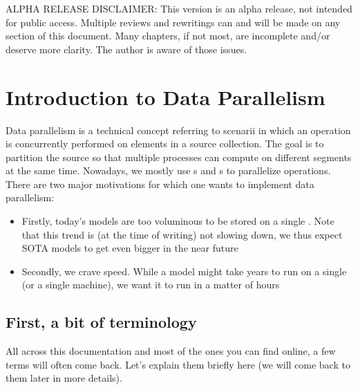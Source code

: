 \documentclass{article}
\begin{document}
ALPHA RELEASE DISCLAIMER: This version is an alpha release, not intended for public access. Multiple reviews and rewritings can and will be made on any section of this document. Many chapters, if not most, are incomplete and/or deserve more clarity. The author is aware of those issues.

\clearpage

\section{Introduction to Data Parallelism}
Data parallelism is a technical concept referring to scenarii in which an operation is concurrently performed on elements in a source collection. The goal is to partition the source so that multiple processes can compute on different segments at the same time. Nowadays, we mostly use s and s to parallelize operations. There are two major motivations for which one wants to implement data parallelism:
\begin{itemize}
  \item Firstly, today's models are too voluminous to be stored on a single . Note that this trend is (at the time of writing) not slowing down, we thus expect \Gls{SOTA} models to get even bigger in the near future
  \item Secondly, we crave speed. While a model might take years to run on a single  (or a single machine), we want it to run in a matter of hours
\end{itemize}

\subsection{First, a bit of terminology}
All across this documentation and most of the ones you can find online, a few terms will often come back. Let's explain them briefly here (we will come back to them later in more details).
\end{document}
